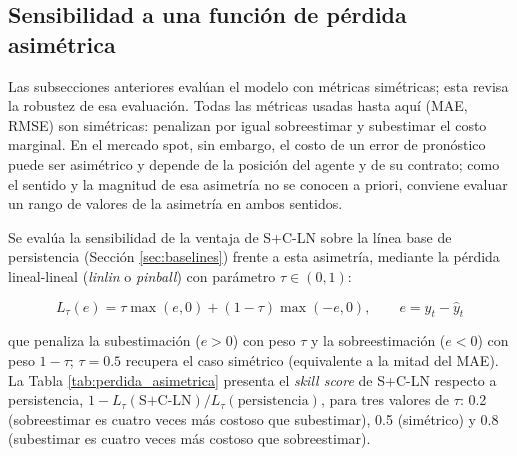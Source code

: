 \subsection{Sensibilidad a una función de pérdida asimétrica}
\label{sec:perdida_asimetrica}

Las subsecciones anteriores evalúan el modelo con métricas simétricas; esta revisa la robustez de esa evaluación. Todas las métricas usadas hasta aquí (MAE, RMSE) son simétricas: penalizan por igual sobreestimar y subestimar el costo marginal. En el mercado spot, sin embargo, el costo de un error de pronóstico puede ser asimétrico y depende de la posición del agente y de su contrato; como el sentido y la magnitud de esa asimetría no se conocen a priori, conviene evaluar un rango de valores de la asimetría en ambos sentidos.

Se evalúa la sensibilidad de la ventaja de S+C-LN sobre la línea base de persistencia (Sección \ref{sec:baselines}) frente a esta asimetría, mediante la pérdida lineal-lineal (\textit{linlin} o \textit{pinball}) con parámetro $\tau \in (0,1)$:

\begin{equation}
    L_\tau(e) = \tau \max(e, 0) + (1-\tau)\max(-e, 0), \qquad e = y_t - \hat{y}_t
    \label{eq:linlin}
\end{equation}

que penaliza la subestimación ($e>0$) con peso $\tau$ y la sobreestimación ($e<0$) con peso $1-\tau$; $\tau=0.5$ recupera el caso simétrico (equivalente a la mitad del MAE). La Tabla \ref{tab:perdida_asimetrica} presenta el \textit{skill score} de S+C-LN respecto a persistencia, $1 - L_\tau(\text{S+C-LN})/L_\tau(\text{persistencia})$, para tres valores de $\tau$: 0.2 (sobreestimar es cuatro veces más costoso que subestimar), 0.5 (simétrico) y 0.8 (subestimar es cuatro veces más costoso que sobreestimar).

